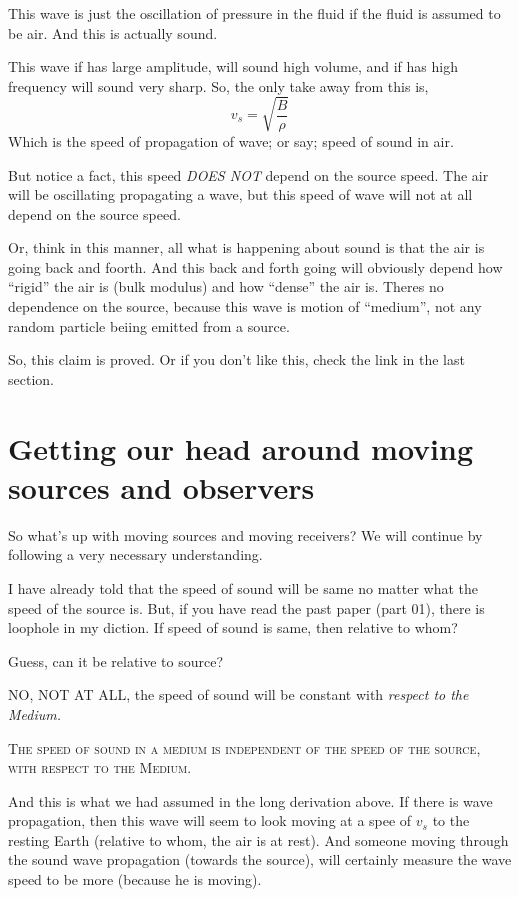 \documentclass[a4paper]{article}
\begin{document}
This wave is just the oscillation of pressure in the fluid if the fluid is assumed to be air. And this is actually sound. 

This wave if has large amplitude, will sound high volume, and if has high frequency will sound very sharp. So, the only take away from this is, 
\begin{equation}
v_s = \sqrt{\frac{ B }{ \rho }}
\end{equation} 
Which is the speed of propagation of wave; or say; speed of sound in air.

But notice a fact, this speed \emph{DOES NOT} depend on the source speed. The air will be oscillating propagating a wave, but this speed of wave will not 
at all depend on the source speed. 

Or, think in this manner, all what is happening about sound is that the air is going back and foorth. And this back and forth going
will obviously depend how ``rigid'' the air is (bulk modulus) and how ``dense'' the air is. Theres no dependence on the source, because this 
wave is motion of ``medium'', not any random particle beiing emitted from a source. 

So, this claim is proved. Or if you don't like this, check the link in the last section. 

\section{Getting our head around moving sources and observers}
So what's up with moving sources and moving receivers? We will continue by following a very necessary understanding. 

I have already told that the speed of sound will be same no matter what the speed of the source is. But, if you have read the past paper (part 01), 
there is loophole in my diction. If speed of sound is same, then relative to whom? 

Guess, can it be relative to source? 

NO, NOT AT ALL, the speed of sound will be constant with \emph{respect to the Medium.} 

\begin{center}
    \textsc{The speed of sound in a medium is independent of the speed of the source, with respect to the Medium.}
\end{center}

And this is what we had assumed in the long derivation above. If there is wave propagation, then this wave will seem to look moving at a spee of $v_s$ to 
the resting Earth (relative to whom, the air is at rest). 
And someone moving through the sound wave propagation (towards the source), will certainly measure the wave speed to be more (because he is moving). 
\end{document}
